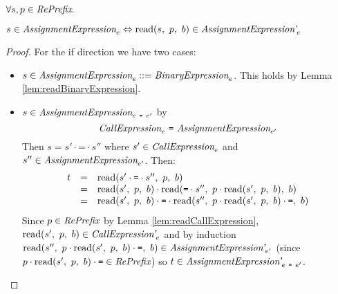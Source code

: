 \documentclass[preprint,10pt]{sigplanconf}
\begin{document}
\begin{lemma}\mbox{}
  
  \( \forall s, p \in \textit{RePrefix}. \)

  \( s \in \textit{AssignmentExpression}_{e} \Leftrightarrow 
  \textrm{read}(s,~p,~b) \in \textit{AssignmentExpression'}_{e} \)
\end{lemma}
\begin{proof}
  For the if direction we have two cases:
  \begin{itemize}
  \item \( s \in \textit{AssignmentExpression}_{e} ::=
    \textit{BinaryExpression}_{e} \). This holds by Lemma
    \ref{lem:readBinaryExpression}.
    
  \item \( s \in \textit{AssignmentExpression}_{e~\texttt{=}~e'} \) by
    \[ 
    \textit{CallExpression}_{e} ~\texttt{=}~
    \textit{AssignmentExpression}_{e'} 
    \]
    Then \( s = s' \cdot \texttt{=} \cdot s'' \) where \( s' \in
    \textit{CallExpression}_{e} \) and \( s'' \in
    \textit{AssignmentExpression}_{e'} \). Then:
    \[
    \begin{array}{rcl}
      t &=& \textrm{read}(s' \cdot \texttt{=} \cdot s'',~p,~b)
      \\
      &=& \textrm{read}(s',~p,~b)
      \cdot \textrm{read}(\texttt{=}\cdot s'',~p \cdot \textrm{read}(s',~p,~b),~b)
      \\
      &=& \textrm{read}(s',~p,~b) \cdot \texttt{=} \cdot
      \textrm{read}(s'',~p \cdot \textrm{read}(s',~p,~b) \cdot \texttt{=},~b)
    \end{array}
    \]
    Since \( p \in \textit{RePrefix} \) by Lemma
    \ref{lem:readCallExpression}, \( \textrm{read}(s',~p,~b) \in
    \textit{CallExpression'}_{e} \) and by induction \( \textrm{read}(s'',~p
      \cdot \textrm{read}(s',~p,~b) \cdot \texttt{=},~b) \in
    \textit{AssignmentExpression'}_{e'} \) 
    (since \( p \cdot \textrm{read}(s',~p,~b) \cdot \texttt{=} \in \textit{RePrefix} \)) so \( t \in
    \textit{AssignmentExpression'}_{e~\texttt{=}~e'} \).
  \end{itemize}
\end{proof}
\end{document}
